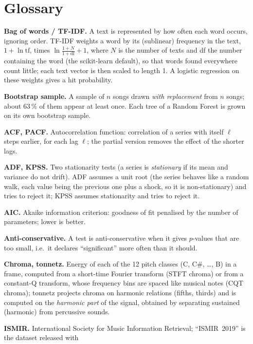 \FloatBarrier
\section{Glossary}\label{app:glossary}
{\footnotesize\setlength{\parskip}{2pt}
\noindent\textbf{Bag of words / TF-IDF.} A text is represented by how often each word occurs, ignoring order. TF-IDF weights a
word by its (sublinear) frequency in the text, $1+\ln\mathrm{tf}$, times $\ln\frac{1+N}{1+\mathrm{df}}+1$, where $N$ is
the number of texts and df the number containing the word (the scikit-learn default), so that words found
everywhere count little; each text vector is then scaled to length 1. A logistic regression on these weights gives a hit probability.\par
\noindent\textbf{Bootstrap sample.} A sample of $n$ songs drawn \emph{with replacement} from $n$ songs; about 63\,\% of them
appear at least once. Each tree of a Random Forest is grown on its own bootstrap sample.\par
\noindent\textbf{ACF, PACF.} Autocorrelation function: correlation of a series with itself $\ell$ steps earlier, for each lag
$\ell$; the partial version removes the effect of the shorter lags.\par
\noindent\textbf{ADF, KPSS.} Two stationarity tests (a series is \emph{stationary} if its mean and variance do not drift). ADF
assumes a unit root (the series behaves like a random walk, each value being the previous one plus a shock, so it
is non-stationary) and tries to reject it; KPSS assumes stationarity and tries to reject it.\par
\noindent\textbf{AIC.} Akaike information criterion: goodness of fit penalised by the number of parameters; lower is better.\par
\noindent\textbf{Anti-conservative.} A test is anti-conservative when it gives $p$-values that are too small, i.e.\ it declares
``significant'' more often than it should.\par
\noindent\textbf{Chroma, tonnetz.} Energy of each of the 12 pitch classes (C, C\#, \dots, B) in a frame, computed from a
short-time Fourier transform (STFT chroma) or from a constant-Q transform, whose frequency bins are spaced like
musical notes (CQT chroma); tonnetz projects chroma on harmonic relations (fifths, thirds) and is computed on the
\emph{harmonic part} of the signal, obtained by separating sustained (harmonic) from percussive sounds.\par
\noindent\textbf{ISMIR.} International Society for Music Information Retrieval; ``ISMIR~2019'' is the dataset released with
}
